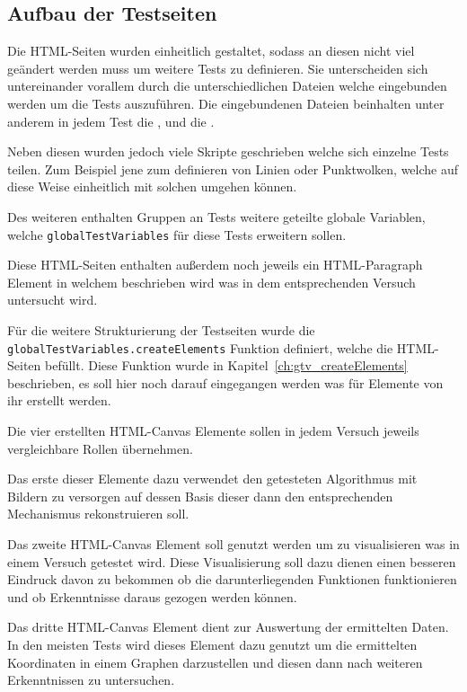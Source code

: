
\subsection{Aufbau der Testseiten}

Die HTML-Seiten wurden einheitlich gestaltet, sodass an diesen nicht viel geändert werden muss um weitere Tests zu definieren.
Sie unterscheiden sich untereinander vorallem durch die unterschiedlichen Dateien welche eingebunden werden um die Tests auszuführen.
Die eingebundenen Dateien beinhalten unter anderem in jedem Test die ,  und die .

Neben diesen wurden jedoch viele Skripte geschrieben welche sich einzelne Tests teilen.
Zum Beispiel jene zum definieren von Linien oder Punktwolken, welche auf diese Weise einheitlich mit solchen umgehen können.

Des weiteren enthalten Gruppen an Tests weitere geteilte globale Variablen, welche \lstinline{globalTestVariables} für diese Tests erweitern sollen.

Diese HTML-Seiten enthalten außerdem noch jeweils ein HTML-Paragraph Element %
in welchem beschrieben wird was in dem entsprechenden Versuch untersucht wird.

Für die weitere Strukturierung der Testseiten wurde die \lstinline{globalTestVariables.createElements} Funktion definiert, welche die HTML-Seiten befüllt.
Diese Funktion wurde in Kapitel~\ref{ch:gtv_createElements} beschrieben, es soll hier noch darauf eingegangen werden was für Elemente von ihr erstellt werden.

Die vier erstellten HTML-Canvas Elemente sollen in jedem Versuch jeweils vergleichbare Rollen übernehmen.

Das erste dieser Elemente dazu verwendet den getesteten Algorithmus mit Bildern zu versorgen auf dessen Basis dieser dann den entsprechenden Mechanismus rekonstruieren soll.

Das zweite HTML-Canvas Element soll genutzt werden um zu visualisieren was in einem Versuch getestet wird.
Diese Visualisierung soll dazu dienen einen besseren Eindruck davon zu bekommen ob die darunterliegenden Funktionen funktionieren und ob Erkenntnisse daraus gezogen werden können.

Das dritte HTML-Canvas Element dient zur Auswertung der ermittelten Daten.
In den meisten Tests wird dieses Element dazu genutzt um die ermittelten Koordinaten in einem Graphen darzustellen und diesen dann nach weiteren Erkenntnissen zu untersuchen.

